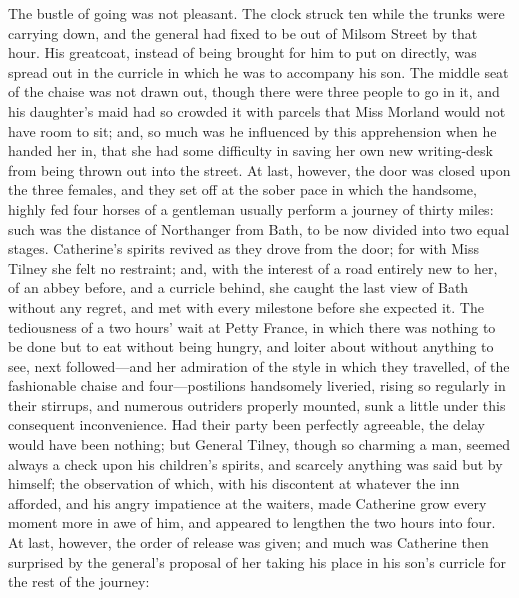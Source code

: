 The bustle of going was not pleasant. The clock struck ten while the trunks were carrying down, and the general had fixed to be out of Milsom Street by that hour. His greatcoat, instead of being brought for him to put on directly, was spread out in the curricle in which he was to accompany his son. The middle seat of the chaise was not drawn out, though there were three people to go in it, and his daughter's maid had so crowded it with parcels that Miss Morland would not have room to sit; and, so much was he influenced by this apprehension when he handed her in, that she had some difficulty in saving her own new writing-desk from being thrown out into the street. At last, however, the door was closed upon the three females, and they set off at the sober pace in which the handsome, highly fed four horses of a gentleman usually perform a journey of thirty miles: such was the distance of Northanger from Bath, to be now divided into two equal stages. Catherine's spirits revived as they drove from the door; for with Miss Tilney she felt no restraint; and, with the interest of a road entirely new to her, of an abbey before, and a curricle behind, she caught the last view of Bath without any regret, and met with every milestone before she expected it. The tediousness of a two hours' wait at Petty France, in which there was nothing to be done but to eat without being hungry, and loiter about without anything to see, next followed---and her admiration of the style in which they travelled, of the fashionable chaise and four---postilions handsomely liveried, rising so regularly in their stirrups, and numerous outriders properly mounted, sunk a little under this consequent inconvenience. Had their party been perfectly agreeable, the delay would have been nothing; but General Tilney, though so charming a man, seemed always a check upon his children's spirits, and scarcely anything was said but by himself; the observation of which, with his discontent at whatever the inn afforded, and his angry impatience at the waiters, made Catherine grow every moment more in awe of him, and appeared to lengthen the two hours into four. At last, however, the order of release was given; and much was Catherine then surprised by the general's proposal of her taking his place in his son's curricle for the rest of the journey: 

